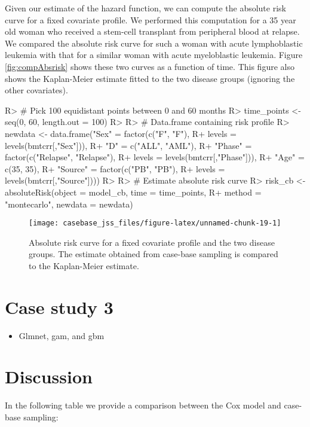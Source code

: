 \documentclass[article]{jss}
\providecommand{\tightlist}{%
  \setlength{\itemsep}{0pt}\setlength{\parskip}{0pt}}
\begin{document}
Given our estimate of the hazard function, we can compute the absolute
risk curve for a fixed covariate profile. We performed this computation
for a 35 year old woman who received a stem-cell transplant from
peripheral blood at relapse. We compared the absolute risk curve for
such a woman with acute lymphoblastic leukemia with that for a similar
woman with acute myeloblastic leukemia. Figure \ref{fig:compAbsrisk}
shows these two curves as a function of time. This figure also shows the
Kaplan-Meier estimate fitted to the two disease groups (ignoring the
other covariates).

\begin{CodeChunk}

\begin{CodeInput}
R> # Pick 100 equidistant points between 0 and 60 months
R> time_points <- seq(0, 60, length.out = 100)
R> 
R> # Data.frame containing risk profile
R> newdata <- data.frame("Sex" = factor(c("F", "F"), 
R+                                      levels = levels(bmtcrr[,"Sex"])),
R+                       "D" = c("ALL", "AML"),
R+                       "Phase" = factor(c("Relapse", "Relapse"), 
R+                                        levels = levels(bmtcrr[,"Phase"])),
R+                       "Age" = c(35, 35),
R+                       "Source" = factor(c("PB", "PB"), 
R+                                         levels = levels(bmtcrr[,"Source"])))
R> 
R> # Estimate absolute risk curve
R> risk_cb <- absoluteRisk(object = model_cb, time = time_points,
R+                         method = "montecarlo", newdata = newdata)
\end{CodeInput}
\end{CodeChunk}

\begin{CodeChunk}
\begin{figure}

{\centering \texttt{[image: casebase\_jss\_files/figure-latex/unnamed-chunk-19-1]} 

}

\caption{\label{fig:compAbsrisk}Absolute risk curve for a fixed covariate profile and the two disease groups. The estimate obtained from case-base sampling is compared to the Kaplan-Meier estimate.}\label{fig:unnamed-chunk-19}
\end{figure}
\end{CodeChunk}

\section{Case study 3}\label{case-study-3}

\begin{itemize}
\tightlist
\item
  Glmnet, gam, and gbm
\end{itemize}

\section{Discussion}\label{discussion}

In the following table we provide a comparison between the Cox model and
case-base sampling:


\end{document}
